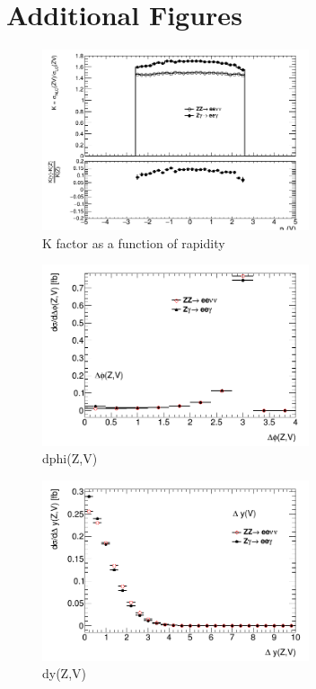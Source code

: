 \documentclass[11pt,a4paper,openright,twoside]{report}
\begin{document}
\chapter{Additional Figures}
\begin{figure}[H]
\centering
	\includegraphics[width=0.7\textwidth]{K_y.png}
	\caption{K factor as a function of rapidity}
	\label{fig:K_y}
\end{figure}
\begin{figure}[H]
\centering
	\includegraphics[width=0.7\textwidth]{dphi.png}
	\caption{dphi(Z,V)}
	\label{fig:dphi}
\end{figure}
\begin{figure}[H]
\centering
	\includegraphics[width=0.7\textwidth]{dy.png}
	\caption{dy(Z,V)}
\end{figure}
\end{document}
